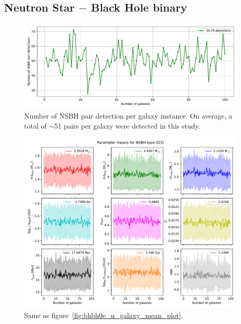 \subsection{Neutron Star $-$ Black Hole binary}
\begin{figure}[!h]
	\centering
	\includegraphics[width=\columnwidth]{analysis_data/004__images_for_latex/NSBH0e_n_detections}
	\caption{Number of NSBH pair detection per galaxy instance. On average, a total of $\sim$51 pairs per galaxy were detected in this study.}
	\label{fig:nsbh0endetections}
\end{figure}

\begin{figure}[!h]
	\centering
	\includegraphics[width=\columnwidth]{analysis_data/004__images_for_latex/NSBH0e_n_galaxy_mean_plot}
	\caption{Same as figure~\ref{fig:bhbh0e_n_galaxy_mean_plot}.}
	\label{fig:nsbh0e_n_galaxy_mean_plot}
\end{figure}
